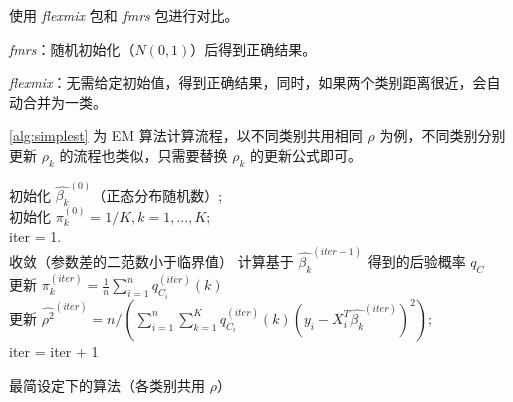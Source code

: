 \documentclass[12pt, a4paper, oneside]{article}
\numberwithin{equation}{section}
\begin{document}
使用 \textit{flexmix} 包和 \textit{fmrs} 包进行对比。

\textit{fmrs}：随机初始化（$N(0,1)$）后得到正确结果。

\textit{flexmix}：无需给定初始值，得到正确结果，同时，如果两个类别距离很近，会自动合并为一类。

\ref{alg:simplest}  为 EM 算法计算流程，以不同类别共用相同 $\rho$ 为例，不同类别分别更新 $\rho_k$ 的流程也类似，只需要替换 $\rho_k$ 的更新公式即可。

\IncMargin{1em} %
\begin{algorithm}
	
	
	\BlankLine
	
	初始化 $\hat{\beta_k}^{(0)}$（正态分布随机数）;\\
	初始化 $\pi_k^{(0)} = 1/K, k = 1,...,K$; \\
	iter = 1.\\
	\Repeat
	{收敛（参数差的二范数小于临界值）}
	{
		计算基于 $\hat{\beta_k}^{(iter-1)}$ 得到的后验概率 $q_C$\\
		更新 $\pi^{(iter)}_k = \frac{1}{n}\sum_{i=1}^{n}q^{(iter)}_{C_i}(k)$ \\
	更新 $\hat{\rho^2}^{(iter)} = n/\left({\sum_{i=1}^{n}\sum_{k=1}^{K}q^{(iter)}_{C_i}(k)(y_i - X_i^T \hat{\beta_k}^{(iter)})^2}\right)$; \\
	iter = iter + 1
	}
	\caption{最简设定下的算法（各类别共用 $\rho$）}
	\label{alg:simplest}
\end{algorithm}
\DecMargin{1em}
\end{document}
